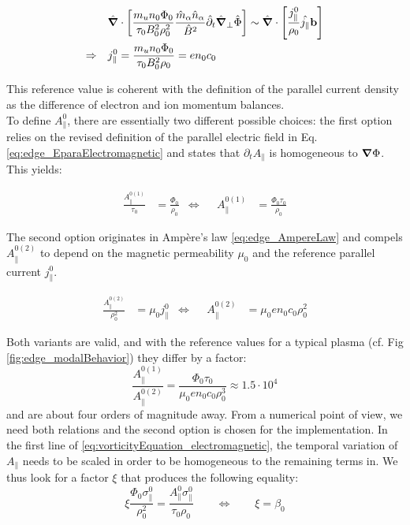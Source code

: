 \begin{align}
	&&&\hat{\grad}\cdot\left[\frac{m_un_0\Phi_0}{\tau_0B_0^2\rho_0^2}\frac{\hat{m}_\alpha \hat{n}_\alpha}{ \hat{B}^2}\hat{\partial}_t\hat{\grad}_\perp\hat{\Phi}\right] \sim \hat{\grad}\cdot\left[\frac{j_\parallel^0}{\rho_0}\hat{j_\parallel}\mathbf{b}\right] \nonumber \\
	\Rightarrow&&& j_\parallel^0 = \frac{m_un_0\Phi_0}{\tau_0B_0^2\rho_0} = en_0c_0
\end{align}

This reference value is coherent with the definition of the parallel current density as the difference of electron and ion momentum balances. \\

To define $A_\parallel^0$, there are essentially two different possible choices: the first option relies on the revised definition of the parallel electric field in Eq. \ref{eq:edge_EparaElectromagnetic} and states that $\partial_tA_\parallel$ is homogeneous to $\grad\Phi$. This yields:

\begin{align}
	\label{eq:FirstOptionApara0}
	\frac{A_\parallel^{0(1)}}{\tau_0} &= \frac{\Phi_0}{\rho_0} &\Leftrightarrow&& A_\parallel^{0(1)} &= \frac{\Phi_0\tau_0}{\rho_0}
\end{align}

The second option originates in Ampère's law \ref{eq:edge_AmpereLaw} and compels $A_\parallel^{0(2)}$ to depend on the magnetic permeability $\mu_0$ and the reference parallel current $j_\parallel^0$.

\begin{align}
	\label{eq:SecondOptionApara0}
	\frac{A_\parallel^{0(2)}}{\rho_0^2} &= \mu_0j_\parallel^0 &\Leftrightarrow&& A_\parallel^{0(2)} &= \mu_0en_0c_0\rho_0^2
\end{align}

Both variants are valid, and with the reference values for a typical plasma (cf. Fig \ref{fig:edge_modalBehavior}) they differ by a factor:
\begin{equation}
	\frac{A_\parallel^{0(1)}}{A_\parallel^{0(2)}} = \frac{\Phi_0\tau_0}{\mu_0en_0c_0\rho_0^3} \approx 1.5\cdot 10^4
\end{equation}
and are about four orders of magnitude away. From a numerical point of view, we need both relations and the second option is chosen for the implementation. In the first line of \autoref{eq:vorticityEquation_electromagnetic}, the temporal variation of $A_\parallel$ needs to be scaled in order to be homogeneous to the remaining terms in. We thus look for a factor $\xi$ that produces the following equality:
\begin{equation}
	\xi \frac{\Phi_0\sigma_\parallel^0}{\rho_0^2} = \frac{A_\parallel^0\sigma_\parallel^0}{\tau_0\rho_0} \qquad\Leftrightarrow\qquad \xi = \beta_0
\end{equation}

